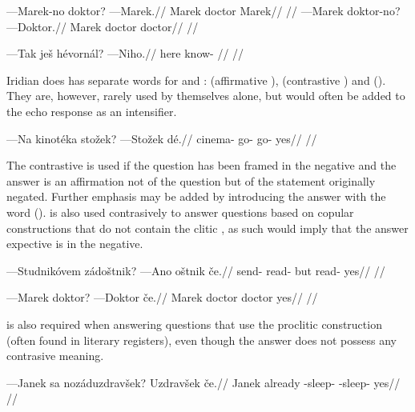 \pex
\a
\begingl
\gla ---Marek-no doktor? ---Marek.//
\glb Marek doctor Marek//
\glft {}//
\endgl
\a
\begingl
\gla ---Marek doktor-no? ---Doktor.//
\glb Marek doctor doctor//
\glft {}//
\endgl
\xe

\pex
\begingl
\gla ---Tak je\v{s} h\'evorn\'al? ---Niho.//
\glb here  know- //
\glft {}//
\endgl
\xe

Iridian does has separate words for  and :  (affirmative ),  (contrastive ) and  (). They are, however, rarely used by themselves alone, but would often be added to the echo response as an intensifier.

\pex
\begingl
\gla ---Na kinot\'eka sto\v{z}ek? ---Sto\v{z}ek d\'e.//
\glb {} cinema- go- go- yes//
\glft {}//
\endgl
\xe

The contrastive  is used if the question has been framed in the negative and the answer  is an affirmation not of the question but of the statement originally negated. Further emphasis may be added by introducing the answer with the word  ().  is also used contrasively to answer questions based on copular constructions that do not contain the clitic , as such would imply that the answer expective is in the negative.

\pex
\begingl
\gla ---Studnik\'ovem z\'ado\v{s}tnik? ---Ano o\v{s}tnik \v{c}e.//
\glb send- read- but read- yes//
\glft {}//
\endgl
\xe

\pex
\begingl
\gla ---Marek doktor? ---Doktor \v{c}e.//
\glb Marek doctor doctor yes//
\glft {}//
\endgl
\xe

 is also required when answering questions that use the proclitic  construction (often found in literary registers), even though the answer does not possess any contrasive meaning.

\pex
\begingl
\gla ---Janek sa noz\'aduzdrav\v{s}ek? Uzdrav\v{s}ek \v{c}e.//
\glb Janek already -sleep- -sleep- yes//
\glft {}//
\endgl
\xe

